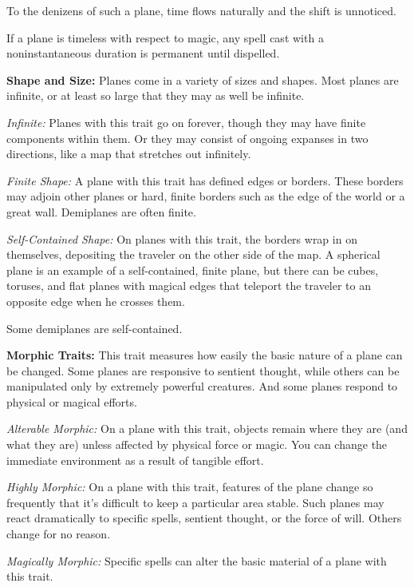 \documentclass{article}
\begin{document}
To the denizens of such a plane, time flows naturally and the shift is unnoticed.

If a plane is timeless with respect to magic, any spell cast with a noninstantaneous 
duration is permanent until dispelled.

\vspace{12pt}
\textbf{Shape and Size:} Planes come in a variety of sizes and shapes. Most planes 
are infinite, or at least so large that they may as well be infinite.

\textit{Infinite: }Planes with this trait go on forever, though they may have finite 
components within them. Or they may consist of ongoing expanses in two directions, 
like a map that stretches out infinitely.

\textit{Finite Shape: }A plane with this trait has defined edges or borders. These 
borders may adjoin other planes or hard, finite borders such as the edge of the 
world or a great wall. Demiplanes are often finite.

\textit{Self-Contained Shape: }On planes with this trait, the borders wrap in on 
themselves, depositing the traveler on the other side of the map. A spherical plane 
is an example of a self-contained, finite plane, but there can be cubes, toruses, 
and flat planes with magical edges that teleport the traveler to an opposite edge 
when he crosses them. 

Some demiplanes are self-contained.

\vspace{12pt}
\textbf{Morphic Traits:} This trait measures how easily the basic nature of a plane 
can be changed. Some planes are responsive to sentient thought, while others can 
be manipulated only by extremely powerful creatures. And some planes respond to 
physical or magical efforts.

\textit{Alterable Morphic: }On a plane with this trait, objects remain where they 
are (and what they are) unless affected by physical force or magic. You can change 
the immediate environment as a result of tangible effort. 

\textit{Highly Morphic: }On a plane with this trait, features of the plane change 
so frequently that it's difficult to keep a particular area stable. Such planes 
may react dramatically to specific spells, sentient thought, or the force of will. 
Others change for no reason. 

\textit{Magically Morphic: }Specific spells can alter the basic material of a plane 
with this trait.
\end{document}

